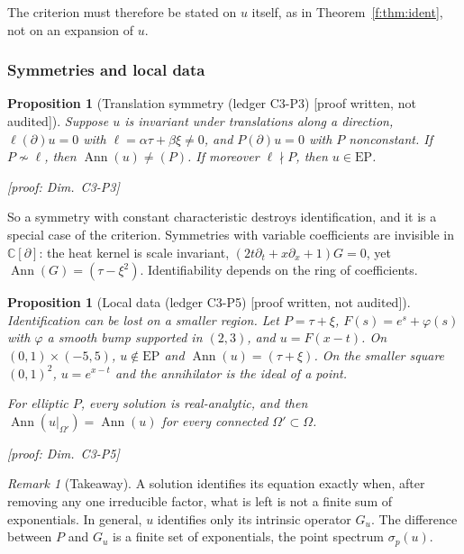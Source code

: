 \documentclass[11pt]{article}
\theoremstyle{plain}
\newtheorem{proposition}[theorem]{Proposition}
\theoremstyle{definition}
\theoremstyle{remark}
\newtheorem{remark}[theorem]{Remark}
\newcommand{\C}{\mathbb{C}}
\DeclareMathOperator{\Ann}{Ann}             %
\newcommand{\EP}{\mathrm{EP}}               %
\newcommand{\badge}[2]{\textcolor{#1}{\textsf{\footnotesize[#2]}}}
\newcommand{\led}[1]{\textcolor{cG}{\textsf{\footnotesize(ledger #1)}}}
\newenvironment{keypoint}{\begin{remark}[Takeaway]}{\end{remark}}
\newcommand{\dimref}[1]{\textsf{\footnotesize[proof: Dim.~#1]}}
\newcommand{\pw}{\badge{cD}{proof written, not audited}}
\begin{document}
The criterion must therefore be stated on $u$ itself, as in Theorem~\ref{f:thm:ident}, not on an expansion of $u$.

\subsubsection{Symmetries and local data}

\begin{proposition}[{Translation symmetry \led{C3-P3} \pw}]\label{prop:sym}
Suppose $u$ is invariant under translations along a direction, $\ell(\partial)u=0$ with $\ell=\alpha\tau+\beta\xi\ne0$, and $P(\partial)u=0$ with $P$ nonconstant. If $P\not\sim\ell$, then $\Ann(u)\ne(P)$. If moreover $\ell\nmid P$, then $u\in\EP$.

\dimref{C3-P3}
\end{proposition}

So a symmetry with constant characteristic destroys identification, and it is a special case of the criterion. Symmetries with variable coefficients are invisible in $\C[\partial]$: the heat kernel is scale invariant, $(2t\partial_t+x\partial_x+1)G=0$, yet $\Ann(G)=(\tau-\xi^2)$. Identifiability depends on the ring of coefficients.

\begin{proposition}[{Local data \led{C3-P5} \pw}]\label{prop:local}
Identification can be lost on a smaller region. Let $P=\tau+\xi$, $F(s)=e^s+\varphi(s)$ with $\varphi$ a smooth bump supported in $(2,3)$, and $u=F(x-t)$. On $(0,1)\times(-5,5)$, $u\notin\EP$ and $\Ann(u)=(\tau+\xi)$. On the smaller square $(0,1)^2$, $u=e^{x-t}$ and the annihilator is the ideal of a point.

For elliptic $P$, every solution is real-analytic, and then $\Ann(u|_{\Omega'})=\Ann(u)$ for every connected $\Omega'\subset\Omega$.

\dimref{C3-P5}
\end{proposition}

\begin{keypoint}
A solution identifies its equation exactly when, after removing any one irreducible factor, what is left is not a finite sum of exponentials. In general, $u$ identifies only its intrinsic operator $G_u$. The difference between $P$ and $G_u$ is a finite set of exponentials, the point spectrum $\sigma_p(u)$.
\end{keypoint}




\end{document}
